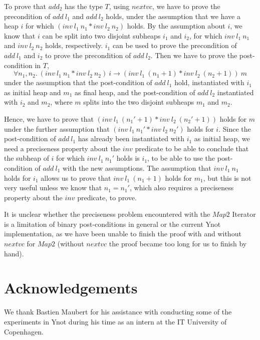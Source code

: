 \documentclass[a4paper,english]{article}
\begin{document}
To prove that $add_2$ has the type $T$, using $nextvc$, we have to prove the
precondition of $add\ l_1$ and $add\ l_2$ holds, under the assumption that we
have a heap $i$ for which $(inv\ l_1\ n_1 * inv\ l_2\ n_2)$ holds. By the
assumption about $i$, we know that $i$ can be split into two disjoint subheaps
$i_1$ and $i_2$, for which $inv\ l_1\ n_1$ and $inv\ l_2\ n_2$ holds,
respectively. $i_1$ can be used to prove the precondition of $add\ l_1$ and
$i_2$ to prove the precondition of $add\ l_2$. Then we have to prove the
post-condition in $T$,
$$\forall n_1, n_2.\ (inv\ l_1\ n_1 * inv\ l_2\ n_2)\ i \rightarrow (inv\ l_1\ (n_1+1) * inv\ l_2\ (n_2+1))\ m$$
under the assumption that the post-condition of $add\ l_1$ hold, instantiated
with $i_1$ as initial heap and $m_1$ as final heap, and the post-condition of
$add\ l_2$ instantiated with $i_2$ and $m_2$, where $m$ splits into the two
disjoint subheaps $m_1$ and $m_2$. 

Hence, we have to prove that $(inv\ l_1\ (n_1'+1) * inv\ l_2\ (n_2'+1))$ holds
for $m$ under the further assumption that $(inv\ l_1\ n_1' * inv\ l_2\ n_2')$
holds for $i$. Since the post-condition of $add\ l_1$ has already been
instantiated with $i_1$ as initial heap, we need a preciseness property about
the $inv$ predicate to be able to conclude that the subheap of $i$ for which
$inv\ l_1\ n_1'$ holds is $i_1$, to be able to use the post-condition of $add\
l_1$ with the new assumptions. The assumption that $inv\ l_1\ n_1$ holds for
$i_1$ allows us to prove that $inv\ l_1\ (n_1+1)$ holds for $m_1$, but this is
not very useful unless we know that $n_1 = n_1'$, which also requires a
preciseness property about the $inv$ predicate, to prove. 

It is unclear whether the preciseness problem encountered with the $Map2$
Iterator is a limitation of binary post-conditions in general or the current
Ynot implementation, as we have been unable to finish the proof with and
without $nextvc$ for $Map2$ (without $nextvc$ the proof became too long for us
to finish by hand). 

\section*{Acknowledgements}

We thank Bastien Maubert for his assistance with conducting some of the
experiments in Ynot during his time as an intern at the IT University of
Copenhagen.


\end{document}
